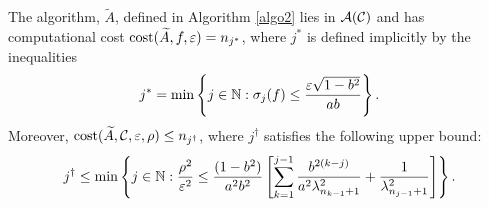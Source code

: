 \documentclass[graybox,footinfo]{svmult}
\begin{document}
\begin{theorem}\label{thm:compcost}
The algorithm, $\widetilde{A}$, defined in Algorithm \ref{algo2} lies in ${\mathcal{A}}({\mathcal{C}})$ and has computational cost $\textup{cost}(\widetilde{A},f,\varepsilon)=n_{j^*}$, where $j^*$ is defined implicitly by the inequalities 
\begin{equation} \label{eq:OurAlgjstar}
j^* = \min\left \{ j \in \bbN : \sigma_{j}(f) \le \frac{\varepsilon\sqrt{1 - b^2}}{ab}  \right\}.
\end{equation}
Moreover, $\textup{cost}(\widetilde{A},{\mathcal{C}},\varepsilon,\rho) \le n_{j^\dagger}$, where $j^\dagger$ satisfies the following upper bound:
\begin{equation} \label{jdagger}
j^\dagger \le \min \left \{j \in \bbN : \frac{\rho^2}{\varepsilon^2} \le \frac{(1 - b^2)}{a^2b^2} \left[ \sum_{k=1}^{j-1} \frac{b^{2(k-j)}}{a^2\lambda_{n_{k-1}+1}^2} + \frac{1}{\lambda_{n_{j-1}+1}^2}\right]   \right\}.
\end{equation}

\end{theorem}
\end{document}
